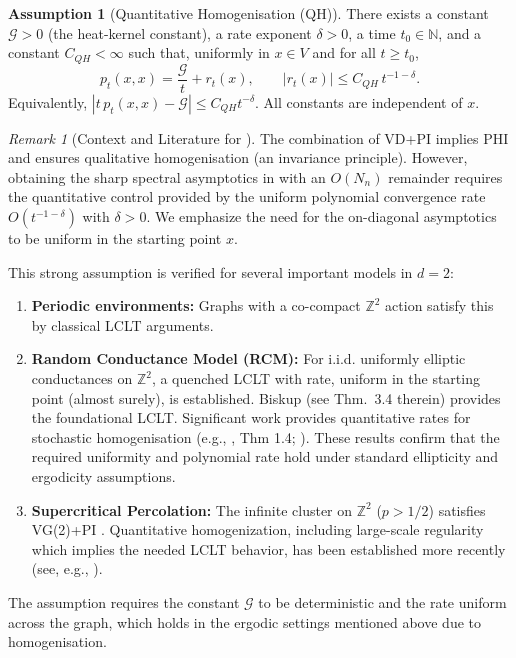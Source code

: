 \documentclass{article}
\numberwithin{equation}{section}
\theoremstyle{definition}
\newtheorem{assumption}[theorem]{Assumption} %
\theoremstyle{remark}
\newtheorem{remark}[theorem]{Remark}
\newcommand{\cG}{\mathcal{G}}
\newcommand{\N}{\mathbb{N}}
\begin{document}
\begin{assumption}[Quantitative Homogenisation (QH)]\label{ass:QH}
There exists a constant $\cG > 0$ (the heat-kernel constant), a rate exponent $\delta>0$, a time $t_0\in\N$, and a constant $C_{QH}<\infty$ such that, uniformly in $x\in V$ and for all $t\ge t_0$,
\begin{equation}\label{eq:return-prob}
  p_t(x,x) = \frac{\cG}{t} + r_t(x),\qquad |r_t(x)| \le C_{QH}\, t^{-1-\delta}.
\end{equation}
Equivalently, $|t\,p_t(x,x)-\cG|\le C_{QH} t^{-\delta}$. All constants are independent of $x$.
\end{assumption}

\begin{remark}[Context and Literature for ]\label{rem:QH_validity}
The combination of VD+PI implies PHI \cite{Delmotte99} and ensures qualitative homogenisation (an invariance principle). However, obtaining the sharp spectral asymptotics in  with an $O(N_n)$ remainder requires the quantitative control provided by the uniform polynomial convergence rate $O(t^{-1-\delta})$ with $\delta>0$. We emphasize the need for the on-diagonal asymptotics to be uniform in the starting point $x$.

This strong assumption is verified for several important models in $d=2$:
\begin{enumerate}
    \item \textbf{Periodic environments:} Graphs with a co-compact $\mathbb{Z}^2$ action satisfy this by classical LCLT arguments.
    \item \textbf{Random Conductance Model (RCM):} For i.i.d. uniformly elliptic conductances on $\mathbb{Z}^2$, a quenched LCLT with rate, uniform in the starting point (almost surely), is established. Biskup \cite{Biskup11} (see Thm.\ 3.4 therein) provides the foundational LCLT. Significant work provides quantitative rates for stochastic homogenisation (e.g., \cite{AndresDeuschelSlowik19}, Thm 1.4; \cite{GloriaOtto17, CroydonHambly21}). These results confirm that the required uniformity and polynomial rate hold under standard ellipticity and ergodicity assumptions.
    \item \textbf{Supercritical Percolation:} The infinite cluster on $\mathbb{Z}^2$ ($p>1/2$) satisfies VG(2)+PI \cite{Barlow04}. Quantitative homogenization, including large-scale regularity which implies the needed LCLT behavior, has been established more recently (see, e.g., \cite{ArmstrongKuusi16}).
\end{enumerate}
The assumption requires the constant $\cG$ to be deterministic and the rate uniform across the graph, which holds in the ergodic settings mentioned above due to homogenisation.
\end{remark}
\end{document}
